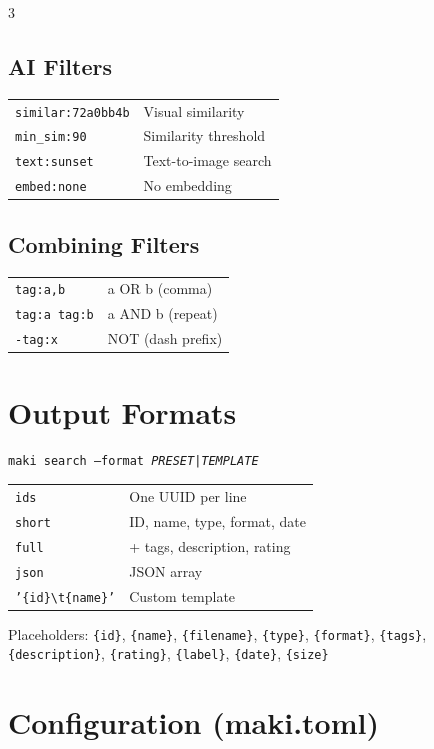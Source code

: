 \documentclass[a4paper,landscape,8pt]{article}
\newcommand{\cmd}[1]{\texttt{\footnotesize #1}}
\begin{document}
\begin{multicols}{3}
\subsection{AI Filters}
\begin{tabularx}{\columnwidth}{@{}lX@{}}
\cmd{similar:72a0bb4b} & Visual similarity \\
\cmd{min\_sim:90} & Similarity threshold \\
\cmd{text:sunset} & Text-to-image search \\
\cmd{embed:none} & No embedding \\
\end{tabularx}

\subsection{Combining Filters}
\begin{tabularx}{\columnwidth}{@{}lX@{}}
\cmd{tag:a,b} & a OR b (comma) \\
\cmd{tag:a tag:b} & a AND b (repeat) \\
\cmd{-tag:x} & NOT (dash prefix) \\
\end{tabularx}

\section{Output Formats}

\cmd{maki search --format \textit{PRESET|TEMPLATE}}

\begin{tabularx}{\columnwidth}{@{}lX@{}}
\cmd{ids} & One UUID per line \\
\cmd{short} & ID, name, type, format, date \\
\cmd{full} & + tags, description, rating \\
\cmd{json} & JSON array \\
\cmd{'\{id\}\textbackslash t\{name\}'} & Custom template \\
\end{tabularx}

Placeholders: \cmd{\{id\}}, \cmd{\{name\}}, \cmd{\{filename\}}, \cmd{\{type\}}, \cmd{\{format\}}, \cmd{\{tags\}}, \cmd{\{description\}}, \cmd{\{rating\}}, \cmd{\{label\}}, \cmd{\{date\}}, \cmd{\{size\}}

\section{Configuration (maki.toml)}


\end{multicols}
\end{document}
